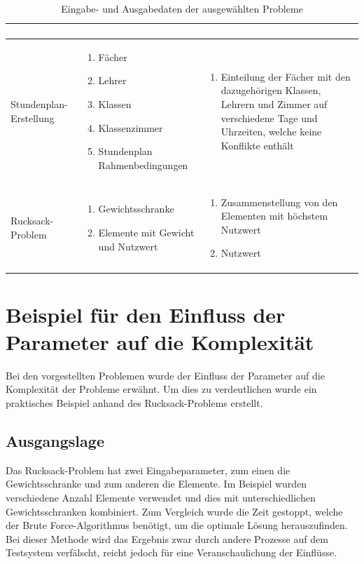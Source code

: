 \begin{table}[ht]
\begin{tabular}{ p{3cm} | p{5.4cm} | p{5.4cm} }
\begin{enumerate}
							   \end{enumerate}	\\ \hline
	Stundenplan-Erstellung			& \begin{enumerate}
								\item Fächer
								\item Lehrer
								\item Klassen
								\item Klassenzimmer
								\item Stundenplan Rahmenbedingungen
							   \end{enumerate}				
							&  \begin{enumerate}
								\item  Einteilung der Fächer mit den dazugehörigen Klassen, Lehrern und Zimmer auf verschiedene Tage und Uhrzeiten, welche keine 
									Konflikte enthält
							   \end{enumerate}	\\ \hline
	Rucksack-Problem				& \begin{enumerate}
								\item Gewichtsschranke
								\item Elemente mit Gewicht und Nutzwert
							   \end{enumerate}				
							&  \begin{enumerate}
								\item Zusammenstellung von den Elementen mit höchstem Nutzwert
								\item Nutzwert
							   \end{enumerate}	\\ \hline
  \end{tabular}
   \caption{Eingabe- und Ausgabedaten der ausgewählten Probleme}\label{table:input_output}
\end{table}

\newpage
\section{Beispiel für den Einfluss der Parameter auf die Komplexität \resultAssignment{[R1a]}}\label{example_complexity_knapsack}
Bei den vorgestellten Problemen wurde der Einfluss der Parameter auf die Komplexität der Probleme erwähnt. Um dies zu verdeutlichen wurde ein praktisches Beispiel anhand des 
Rucksack-Problems erstellt.

\subsection{Ausgangslage}
Das Rucksack-Problem hat zwei Eingabeparameter, zum einen die Gewichtsschranke und zum anderen die Elemente. Im Beispiel wurden verschiedene Anzahl Elemente verwendet und dies mit 
unterschiedlichen Gewichtsschranken kombiniert. Zum Vergleich wurde die Zeit gestoppt, welche der Brute Force-Algorithmus benötigt, um die optimale Lösung herauszufinden. Bei dieser 
Methode wird das Ergebnis zwar durch andere Prozesse auf dem Testsystem verfälscht, reicht jedoch für eine Veranschaulichung der Einflüsse.

